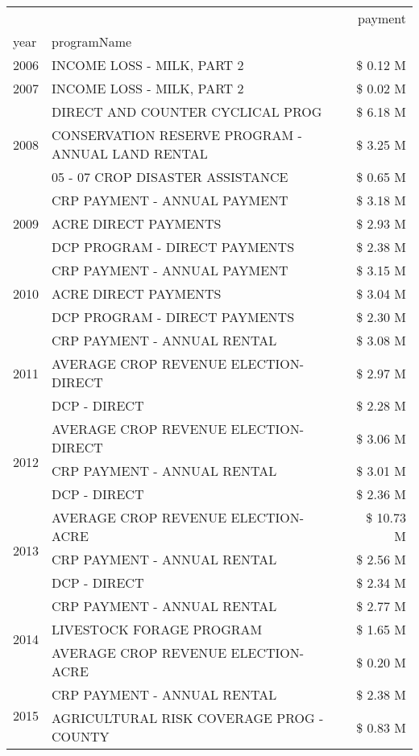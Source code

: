 \begin{tabular}{llr}
\toprule
 &  & payment \\
year & programName &  \\
\midrule
2006 & INCOME LOSS - MILK, PART 2 & \$ 0.12 M \\
\cline{1-3}
2007 & INCOME LOSS - MILK, PART 2 & \$ 0.02 M \\
\cline{1-3}
\multirow[t]{3}{*}{2008} & DIRECT AND COUNTER CYCLICAL PROG & \$ 6.18 M \\
 & CONSERVATION RESERVE PROGRAM - ANNUAL LAND RENTAL & \$ 3.25 M \\
 & 05 - 07 CROP DISASTER ASSISTANCE & \$ 0.65 M \\
\cline{1-3}
\multirow[t]{3}{*}{2009} & CRP PAYMENT - ANNUAL PAYMENT & \$ 3.18 M \\
 & ACRE DIRECT PAYMENTS & \$ 2.93 M \\
 & DCP PROGRAM - DIRECT PAYMENTS & \$ 2.38 M \\
\cline{1-3}
\multirow[t]{3}{*}{2010} & CRP PAYMENT - ANNUAL PAYMENT & \$ 3.15 M \\
 & ACRE DIRECT PAYMENTS & \$ 3.04 M \\
 & DCP PROGRAM - DIRECT PAYMENTS & \$ 2.30 M \\
\cline{1-3}
\multirow[t]{3}{*}{2011} & CRP PAYMENT - ANNUAL RENTAL & \$ 3.08 M \\
 & AVERAGE CROP REVENUE ELECTION-DIRECT & \$ 2.97 M \\
 & DCP - DIRECT & \$ 2.28 M \\
\cline{1-3}
\multirow[t]{3}{*}{2012} & AVERAGE CROP REVENUE ELECTION-DIRECT & \$ 3.06 M \\
 & CRP PAYMENT - ANNUAL RENTAL & \$ 3.01 M \\
 & DCP - DIRECT & \$ 2.36 M \\
\cline{1-3}
\multirow[t]{3}{*}{2013} & AVERAGE CROP REVENUE ELECTION-ACRE & \$ 10.73 M \\
 & CRP PAYMENT - ANNUAL RENTAL & \$ 2.56 M \\
 & DCP - DIRECT & \$ 2.34 M \\
\cline{1-3}
\multirow[t]{3}{*}{2014} & CRP PAYMENT - ANNUAL RENTAL & \$ 2.77 M \\
 & LIVESTOCK FORAGE PROGRAM & \$ 1.65 M \\
 & AVERAGE CROP REVENUE ELECTION-ACRE & \$ 0.20 M \\
\cline{1-3}
\multirow[t]{3}{*}{2015} & CRP PAYMENT - ANNUAL RENTAL & \$ 2.38 M \\
 & AGRICULTURAL RISK COVERAGE PROG - COUNTY & \$ 0.83 M \\

\end{tabular}
